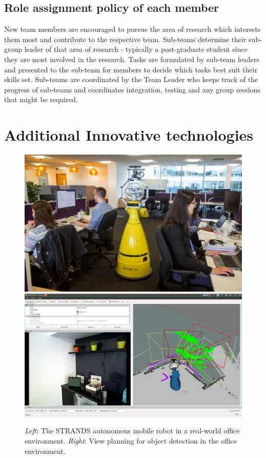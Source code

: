 \documentclass[runningheads,a4paper]{llncs}
\begin{document}

\subsection{Role assignment policy of each member}
New team members are encouraged to pursue the area of research which interests them most and contribute to the respective team. Sub-teams determine their sub-group leader of that area of research - typically a post-graduate student since they are most involved in the research. Tasks are formulated by sub-team leaders and presented  to the sub-team for members to decide which tasks best suit their skills set. Sub-teams are coordinated by the Team Leader who keeps track of the progress of sub-teams and coordinates integration, testing and any group sessions that might be required.

\section{Additional Innovative technologies}
\begin{figure}[tb]
  \begin{center}
    \includegraphics[width=.43\columnwidth]{images/betty.jpg}
    \includegraphics[width=.55\columnwidth,clip,trim=10ex 20ex 10ex 20ex]{images/viewplanning_at_tsc.png}
  \end{center} 
  \vspace{-10pt}  
  \caption{\textit{Left}: The STRANDS autonomous mobile robot in a real-world
  office environment. \textit{Right}: View planning for object detection in the
  office environment.}
  \label{fig:mk}
  \vspace{-3ex}
\end{figure}
\end{document}

